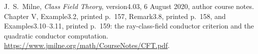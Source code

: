 J.~S.~Milne, \emph{Class Field Theory}, version4.03,
6 August 2020, author course notes. Chapter V, Example3.2, printed p.~157,
Remark3.8, printed p.~158,
and Examples3.10--3.11, printed p.~159: the ray-class-field
conductor criterion and the quadratic conductor computation.
\url{https://www.jmilne.org/math/CourseNotes/CFT.pdf}.
